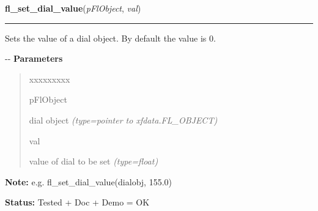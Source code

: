     \label{xformslib:fldial:fl_set_dial_value}

    \vspace{0.5ex}

\hspace{.8\funcindent}\begin{boxedminipage}{\funcwidth}

    \raggedright \textbf{fl\_set\_dial\_value}(\textit{pFlObject}, \textit{val})

    \vspace{-1.5ex}

    \rule{\textwidth}{0.5\fboxrule}
\setlength{\parskip}{2ex}

Sets the value of a dial object. By default the value is 0.

-{}-
\setlength{\parskip}{1ex}
      \textbf{Parameters}
      \vspace{-1ex}

      \begin{quote}
        \begin{Ventry}{xxxxxxxxx}

          \item[pFlObject]


dial object
            {\it (type=pointer to xfdata.FL\_OBJECT)}

          \item[val]


value of dial to be set
            {\it (type=float)}

        \end{Ventry}

      \end{quote}

\textbf{Note:} 
e.g. fl\_set\_dial\_value(dialobj, 155.0)


\textbf{Status:} 
Tested + Doc + Demo = OK


    \end{boxedminipage}

    \label{xformslib:fldial:fl_get_dial_value}

    \vspace{0.5ex}

